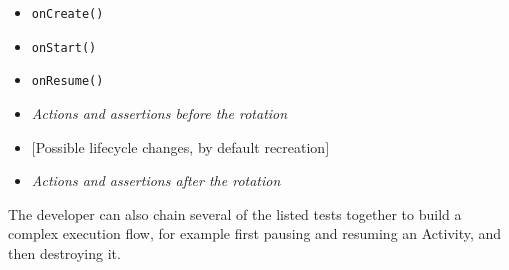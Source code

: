 \documentclass[11pt,a4paper,notitlepage]{article}
\begin{document}
\begin{itemize}
	\begin{itemize}
		\item \texttt{onCreate()}
		\item \texttt{onStart()}
		\item \texttt{onResume()}
		\item \textit{Actions and assertions before the rotation}
		\item $[$Possible lifecycle changes, by default recreation$]$
		\item \textit{Actions and assertions after the rotation}
	\end{itemize}
\end{itemize}
The developer can also chain several of the listed tests together to build a complex execution flow, for example first pausing and resuming an Activity, and then destroying it.
\end{document}

